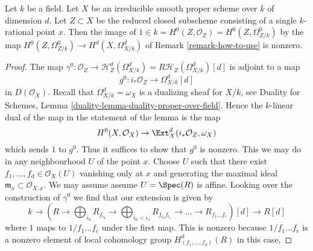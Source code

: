 \begin{lemma}
\label{lemma-class-of-a-point}
Let $k$ be a field. Let $X$ be an irreducible smooth proper scheme over $k$
of dimension $d$. Let $Z \subset X$ be the reduced closed subscheme consisting
of a single $k$-rational point $x$. Then the image of
$1 \in k = H^0(Z, \mathcal{O}_Z) = H^0(Z, \Omega^0_{Z/k})$
by the map $H^0(Z, \Omega^0_{Z/k}) \to H^d(X, \Omega^d_{X/k})$
of Remark \ref{remark-how-to-use} is nonzero.
\end{lemma}

\begin{proof}
The map $\gamma^0 : \mathcal{O}_Z \to
\mathcal{H}^d_Z(\Omega^d_{X/k}) = R\mathcal{H}_Z(\Omega^d_{X/k})[d]$
is adjoint to a map
$$
g^0 : i_*\mathcal{O}_Z \longrightarrow \Omega^d_{X/k}[d]
$$
in $D(\mathcal{O}_X)$. Recall that $\Omega^d_{X/k} = \omega_X$ is a
dualizing sheaf for $X/k$, see
Duality for Schemes, Lemma \ref{duality-lemma-duality-proper-over-field}.
Hence the $k$-linear dual of the map in the statement
of the lemma is the map
$$
H^0(X, \mathcal{O}_X) \to \Ext^d_X(i_*\mathcal{O}_Z, \omega_X)
$$
which sends $1$ to $g^0$. Thus it suffices to show that $g^0$ is nonzero.
This we may do in any neighbourhood $U$ of the point $x$. Choose $U$
such that there exist $f_1, \ldots, f_d \in \mathcal{O}_X(U)$
vanishing only at $x$ and generating the maximal ideal
$\mathfrak m_x \subset \mathcal{O}_{X, x}$. We may assume
assume $U = \Spec(R)$ is affine. Looking over the
construction of $\gamma^0$ we find that our extension is given by
$$
k \to
(R \to \bigoplus\nolimits_{i_0} R_{f_{i_0}} \to
\bigoplus\nolimits_{i_0 < i_1} R_{f_{i_0}f_{i_1}} \to
\ldots \to R_{f_1\ldots f_r})[d] \to R[d]
$$
where $1$ maps to $1/f_1 \ldots f_c$ under the first map.
This is nonzero because $1/f_1 \ldots f_c$ is a nonzero element
of local cohomology group $H^d_{(f_1, \ldots, f_d)}(R)$ in this case,
\end{proof}















